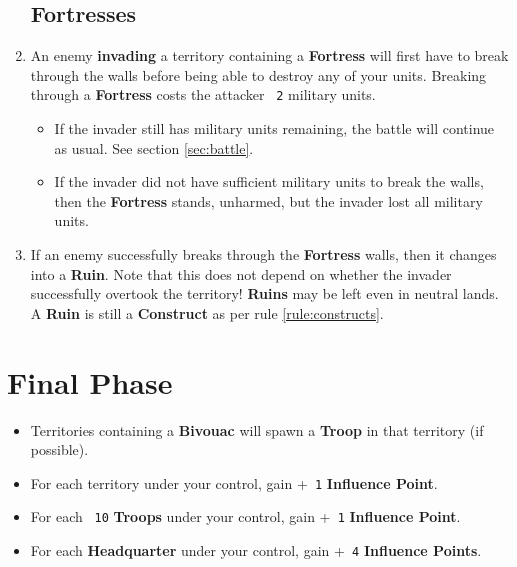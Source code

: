 \documentclass[10pt,openright,a4paper,openany]{article}
\newcommand{\num}[1]{\texttt{\color{purple} {#1}}}
\newcommand{\term}[1]{\textbf{\color{purple} #1}}
\newcommand{\headquarter}{\term{Headquarter}}
\newcommand{\fortress}{\term{Fortress}}
\begin{document}
\begin{enumerate}
	\subsection*{Fortresses}
	\item An enemy \term{invading} a territory containing a \fortress{} will first have to break through the walls before being able to destroy any of your units. Breaking through a \fortress{} costs the attacker \num{2} military units.
	\begin{itemize}
		\item If the invader still has military units remaining, the battle will continue as usual. See section \ref{sec:battle}.
		\item If the invader did not have sufficient military units to break the walls, then the \fortress{} stands, unharmed, but the invader lost all military units.
	\end{itemize}
\item If an enemy successfully breaks through the \fortress{} walls, then it changes into a \term{Ruin}. Note that this does not depend on whether the invader successfully overtook the territory! \term{Ruins} may be left even in neutral lands. A \term{Ruin} is still a \term{Construct} as per rule \ref{rule:constructs}.
\end{enumerate}

\section{Final Phase}\label{sec:final}
\begin{itemize}
\item Territories containing a \term{Bivouac} will spawn a \term{Troop} in that territory (if possible).
\item For each territory under your control, gain +\num{1} \term{Influence Point}.
\item For each \num{10} \term{Troops} under your control, gain +\num{1} \term{Influence Point}.
\item For each \headquarter{} under your control, gain +\num{4} \term{Influence Points}.
\end{itemize}
\end{document}
